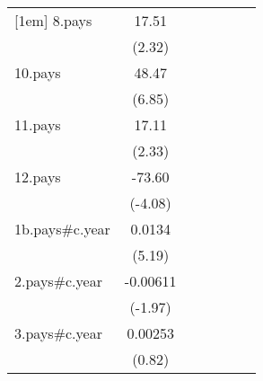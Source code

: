 {\begin{tabular}{l*{6}{c}}
[1em]
8.pays              &       17.51\sym{*}  &                     &                     &                     &                     &                     \\
                    &      (2.32)         &                     &                     &                     &                     &                     \\
[1em]
10.pays             &       48.47\sym{***}&                     &                     &                     &                     &                     \\
                    &      (6.85)         &                     &                     &                     &                     &                     \\
[1em]
11.pays             &       17.11\sym{*}  &                     &                     &                     &                     &                     \\
                    &      (2.33)         &                     &                     &                     &                     &                     \\
[1em]
12.pays             &      -73.60\sym{***}&                     &                     &                     &                     &                     \\
                    &     (-4.08)         &                     &                     &                     &                     &                     \\
[1em]
1b.pays#c.year      &      0.0134\sym{***}&                     &                     &                     &                     &                     \\
                    &      (5.19)         &                     &                     &                     &                     &                     \\
[1em]
2.pays#c.year       &    -0.00611\sym{*}  &                     &                     &                     &                     &                     \\
                    &     (-1.97)         &                     &                     &                     &                     &                     \\
[1em]
3.pays#c.year       &     0.00253         &                     &                     &                     &                     &                     \\
                    &      (0.82)         &                     &                     &                     &                     &                     \\

\end{tabular}}
